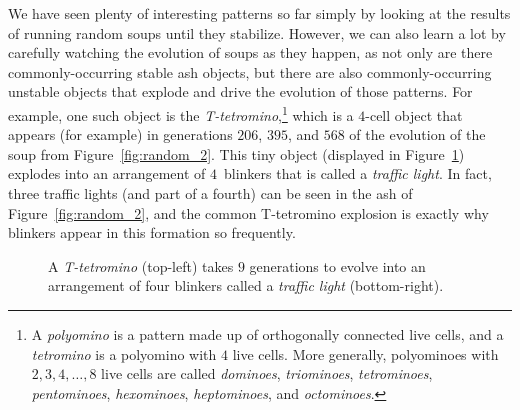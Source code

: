 We have seen plenty of interesting patterns so far simply by looking at the results of running random soups until they stabilize. However, we can also learn a lot by carefully watching the evolution of soups as they happen, as not only are there commonly-occurring stable ash objects, but there are also commonly-occurring unstable objects that explode and drive the evolution of those patterns. For example, one such object is the \emph{T-tetromino},\footnote{A \emph{polyomino} is a pattern made up of orthogonally connected live cells, and a \emph{tetromino} is a polyomino with $4$ live cells. More generally, polyominoes with $2, 3, 4, \ldots, 8$ live cells are called \emph{dominoes}, \emph{triominoes}, \emph{tetrominoes}, \emph{pentominoes}, \emph{hexominoes}, \emph{heptominoes}, and \emph{octominoes}.} which is a $4$-cell object that appears (for example) in generations $206$, $395$, and $568$ of the evolution of the soup from Figure~\ref{fig:random_2}. This tiny object (displayed in Figure~\ref{fig:t_tetromino}) explodes into an arrangement of $4$~blinkers that is called a \emph{traffic light}. In fact, three traffic lights (and part of a fourth) can be seen in the ash of Figure~\ref{fig:random_2}, and the common T-tetromino explosion is exactly why blinkers appear in this formation so frequently.

\begin{figure}[!htb]
	\centering
	\caption{A \emph{T-tetromino} (top-left) takes $9$ generations to evolve into an arrangement of four blinkers called a \emph{traffic light} (bottom-right).}\label{fig:t_tetromino}
\end{figure}

